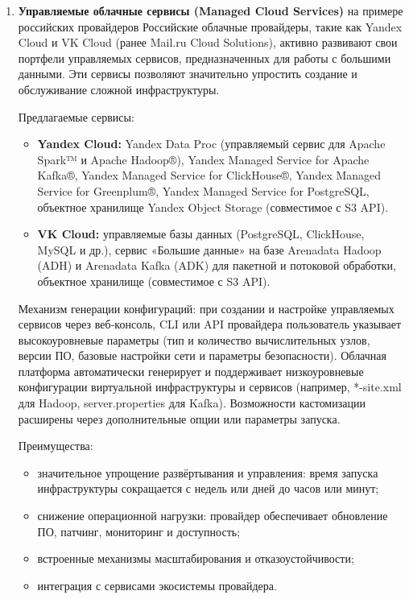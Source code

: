 \begin{enumerate}
	\item \textbf{Управляемые облачные сервисы (Managed Cloud Services)} на примере российских провайдеров
	      Российские облачные провайдеры, такие как Yandex Cloud\cite{yc} и VK Cloud\cite{vk_cloud} (ранее Mail.ru Cloud Solutions), активно развивают свои портфели управляемых сервисов, предназначенных для работы с большими данными. Эти сервисы позволяют значительно упростить создание и обслуживание сложной инфраструктуры.

	      Предлагаемые сервисы:
	      \begin{itemize}
		      \item \textbf{Yandex Cloud:} Yandex Data Proc (управляемый сервис для Apache Spark™ и Apache Hadoop®), Yandex Managed Service for Apache Kafka®, Yandex Managed Service for ClickHouse®, Yandex Managed Service for Greenplum®, Yandex Managed Service for PostgreSQL, объектное хранилище Yandex Object Storage (совместимое с S3 API).
		      \item \textbf{VK Cloud:} управляемые базы данных (PostgreSQL, ClickHouse, MySQL и др.), сервис «Большие данные» на базе Arenadata Hadoop (ADH) и Arenadata Kafka (ADK) для пакетной и потоковой обработки, объектное хранилище (совместимое с S3 API).
	      \end{itemize}

	      Механизм генерации конфигураций: при создании и настройке управляемых сервисов через веб-консоль, CLI или API провайдера пользователь указывает высокоуровневые параметры (тип и количество вычислительных узлов, версии ПО, базовые настройки сети и параметры безопасности). Облачная платформа автоматически генерирует и поддерживает низкоуровневые конфигурации виртуальной инфраструктуры и сервисов (например, *-site.xml для Hadoop, server.properties для Kafka). Возможности кастомизации расширены через дополнительные опции или параметры запуска.

	      Преимущества:
	      \begin{itemize}
		      \item значительное упрощение развёртывания и управления: время запуска инфраструктуры сокращается с недель или дней до часов или минут;
		      \item снижение операционной нагрузки: провайдер обеспечивает обновление ПО, патчинг, мониторинг и доступность;
		      \item встроенные механизмы масштабирования и отказоустойчивости;
		      \item интеграция с сервисами экосистемы провайдера.
	      \end{itemize}


\end{enumerate}
